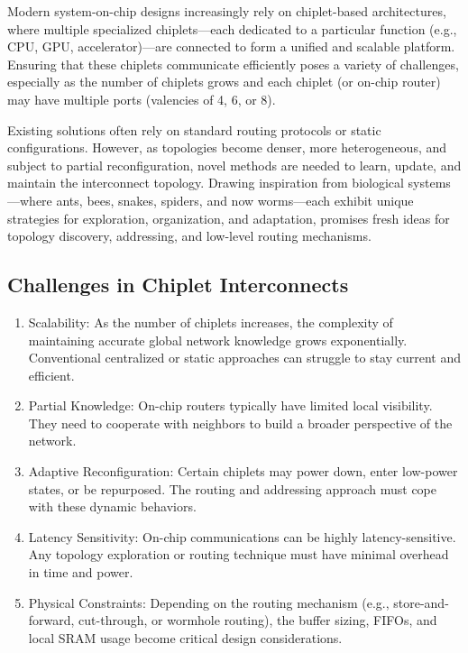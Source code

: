 \documentclass[../OAE-SPEC-MAIN.tex]{subfiles}
\begin{document}
Modern system-on-chip designs increasingly rely on chiplet-based architectures, where multiple specialized chiplets—each dedicated to a particular function (e.g., CPU, GPU, accelerator)—are connected to form a unified and scalable platform. Ensuring that these chiplets communicate efficiently poses a variety of challenges, especially as the number of chiplets grows and each chiplet (or on-chip router) may have multiple ports (valencies of 4, 6, or 8).

Existing solutions often rely on standard routing protocols or static configurations. However, as topologies become denser, more heterogeneous, and subject to partial reconfiguration, novel methods are needed to learn, update, and maintain the interconnect topology. Drawing inspiration from biological systems—where ants, bees, snakes, spiders, and now worms—each exhibit unique strategies for exploration, organization, and adaptation, promises fresh ideas for topology discovery, addressing, and low-level routing mechanisms.

\subsection{Challenges in Chiplet Interconnects}

\begin{enumerate}

\item  Scalability: As the number of chiplets increases, the complexity of maintaining accurate global network knowledge grows exponentially. Conventional centralized or static approaches can struggle to stay current and efficient.
\item  Partial Knowledge: On-chip routers typically have limited local visibility. They need to cooperate with neighbors to build a broader perspective of the network.
\item  Adaptive Reconfiguration: Certain chiplets may power down, enter low-power states, or be repurposed. The routing and addressing approach must cope with these dynamic behaviors.
\item  Latency Sensitivity: On-chip communications can be highly latency-sensitive. Any topology exploration or routing technique must have minimal overhead in time and power.
\item  Physical Constraints: Depending on the routing mechanism (e.g., store-and-forward, cut-through, or wormhole routing), the buffer sizing, FIFOs, and local SRAM usage become critical design considerations.
	
\end{enumerate}
\end{document}
